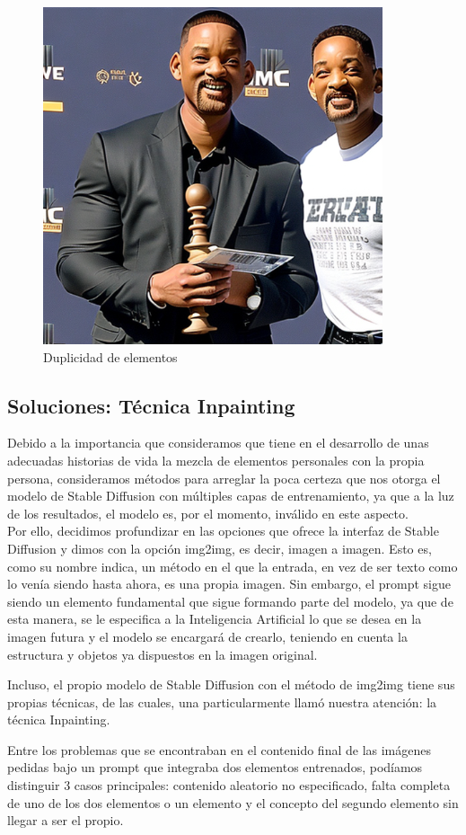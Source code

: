 \begin{figure}[h]
	\centering
	\includegraphics[width = 0.5
	\textwidth]{Imagenes/Vectorial/duplicidad_will.png}
		\caption{Duplicidad de elementos}
	\label{fig:willpor2}
\end{figure}

\subsection{Soluciones: Técnica Inpainting}

Debido a la importancia que consideramos que tiene en el desarrollo de unas adecuadas historias de vida la mezcla de elementos personales con la propia persona, consideramos métodos para arreglar la poca certeza que nos otorga el modelo de Stable Diffusion con múltiples capas de entrenamiento, ya que a la luz de los resultados, el modelo es, por el momento, inválido en este aspecto. \\

Por ello, decidimos profundizar en las opciones que ofrece la interfaz de Stable Diffusion y dimos con la opción img2img, es decir, imagen a imagen. Esto es, como su nombre indica, un método en el que la entrada, en vez de ser texto como lo venía siendo hasta ahora, es una propia imagen. Sin embargo, el prompt sigue siendo un elemento fundamental que sigue formando parte del modelo, ya que de esta manera, se le especifica a la Inteligencia Artificial lo que se desea en la imagen futura y el modelo se encargará de crearlo, teniendo en cuenta la estructura y objetos ya dispuestos en la imagen original. 

Incluso, el propio modelo de Stable Diffusion con el método de img2img tiene sus propias técnicas, de las cuales, una particularmente llamó nuestra atención: la técnica Inpainting. 

Entre los problemas que se encontraban en el contenido final de las imágenes pedidas bajo un prompt que integraba dos elementos entrenados, podíamos distinguir 3 casos principales: contenido aleatorio no especificado, falta completa de uno de los dos elementos o un elemento y el concepto del segundo elemento sin llegar a ser el propio. 

